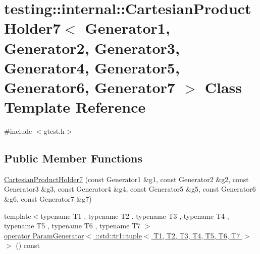 \hypertarget{classtesting_1_1internal_1_1_cartesian_product_holder7}{\section{testing\-:\-:internal\-:\-:Cartesian\-Product\-Holder7$<$ Generator1, Generator2, Generator3, Generator4, Generator5, Generator6, Generator7 $>$ Class Template Reference}
\label{classtesting_1_1internal_1_1_cartesian_product_holder7}
}


{\ttfamily \#include $<$gtest.\-h$>$}

\subsection*{Public Member Functions}
\begin{DoxyCompactItemize}
\item 
\hyperlink{classtesting_1_1internal_1_1_cartesian_product_holder7_a289e661f9252bac3570700410eb041b3}{Cartesian\-Product\-Holder7} (const Generator1 \&g1, const Generator2 \&g2, const Generator3 \&g3, const Generator4 \&g4, const Generator5 \&g5, const Generator6 \&g6, const Generator7 \&g7)
\item 
{\footnotesize template$<$typename T1 , typename T2 , typename T3 , typename T4 , typename T5 , typename T6 , typename T7 $>$ }\\\hyperlink{classtesting_1_1internal_1_1_cartesian_product_holder7_a15534c2aff6f6d1ed6756d06b95b94e9}{operator Param\-Generator$<$ \-::std\-::tr1\-::tuple$<$ T1, T2, T3, T4, T5, T6, T7 $>$ $>$} () const 
\end{DoxyCompactItemize}


